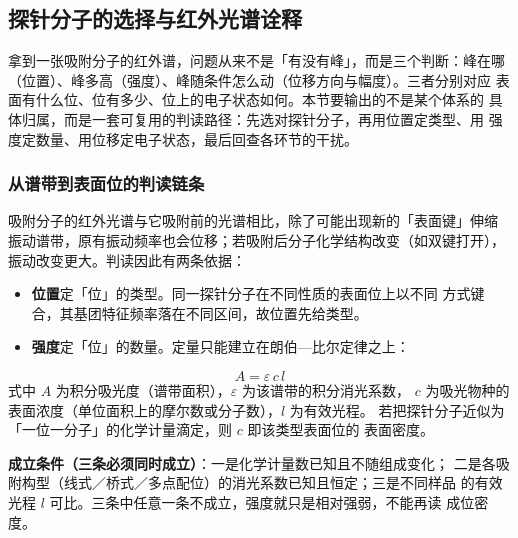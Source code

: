 
\subsection{探针分子的选择与红外光谱诠释}

\begin{probout}
拿到一张吸附分子的红外谱，问题从来不是「有没有峰」，而是三个判断：峰在哪
（位置）、峰多高（强度）、峰随条件怎么动（位移方向与幅度）。三者分别对应
表面有什么位、位有多少、位上的电子状态如何。本节要输出的不是某个体系的
具体归属，而是一套可复用的判读路径：先选对探针分子，再用位置定类型、用
强度定数量、用位移定电子状态，最后回查各环节的干扰。
\end{probout}

\subsubsection{从谱带到表面位的判读链条}

\begin{principle}
吸附分子的红外光谱与它吸附前的光谱相比，除了可能出现新的「表面键」伸缩
振动谱带，原有振动频率也会位移；若吸附后分子化学结构改变（如双键打开），
振动改变更大。判读因此有两条依据：
\begin{itemize}
  \item \textbf{位置}定「位」的类型。同一探针分子在不同性质的表面位上以不同
        方式键合，其基团特征频率落在不同区间，故位置先给类型。
  \item \textbf{强度}定「位」的数量。定量只能建立在朗伯—比尔定律之上：
\end{itemize}
\begin{equation}
  A=\varepsilon\,c\,l
  \label{eq:ch07b-beer}
\end{equation}
式中 $A$ 为积分吸光度（谱带面积），$\varepsilon$ 为该谱带的积分消光系数，
$c$ 为吸光物种的表面浓度（单位面积上的摩尔数或分子数），$l$ 为有效光程。
若把探针分子近似为「一位一分子」的化学计量滴定，则 $c$ 即该类型表面位的
表面密度。

\textbf{成立条件（三条必须同时成立）}：一是化学计量数已知且不随组成变化；
二是各吸附构型（线式／桥式／多点配位）的消光系数已知且恒定；三是不同样品
的有效光程 $l$ 可比。三条中任意一条不成立，强度就只是相对强弱，不能再读
成位密度。
\end{principle}


